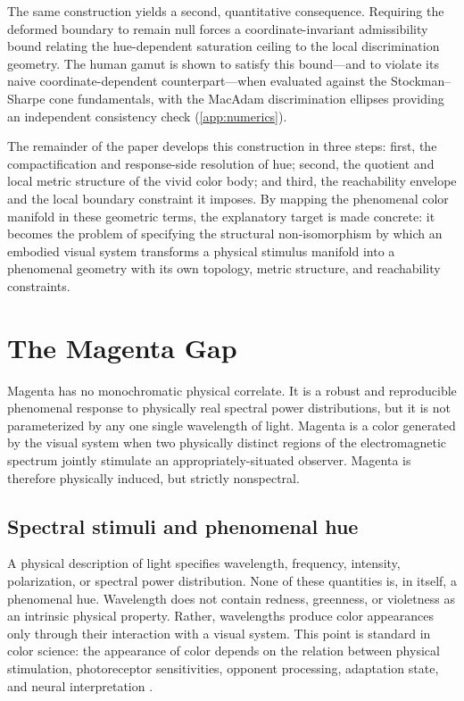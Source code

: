 \documentclass[preprint,12pt,authoryear]{elsarticle}
\theoremstyle{plain}
\theoremstyle{definition}
\theoremstyle{remark}
\begin{document}
The same construction yields a second, quantitative consequence. Requiring the deformed boundary to remain null forces a coordinate-invariant admissibility bound relating the hue-dependent saturation ceiling to the local discrimination geometry. The human gamut is shown to satisfy this bound---and to violate its naive coordinate-dependent counterpart---when evaluated against the Stockman--Sharpe cone fundamentals, with the MacAdam discrimination ellipses providing an independent consistency check (\ref{app:numerics}).

The remainder of the paper develops this construction in three steps: first, the compactification and response-side resolution of hue; second, the quotient and local metric structure of the vivid color body; and third, the reachability envelope and the local boundary constraint it imposes. By mapping the phenomenal color manifold in these geometric terms, the explanatory target is made concrete: it becomes the problem of specifying the structural non-isomorphism by which an embodied visual system transforms a physical stimulus manifold into a phenomenal geometry with its own topology, metric structure, and reachability constraints.


\section{The Magenta Gap}
\label{sec:magenta-gap}

\noindent Magenta has no monochromatic physical correlate. It is a robust and reproducible phenomenal response to physically real spectral power distributions, but it is not parameterized by any one single wavelength of light. Magenta is a color generated by the visual system when two physically distinct regions of the electromagnetic spectrum jointly stimulate an appropriately-situated observer. Magenta is therefore physically induced, but strictly nonspectral.

\subsection{Spectral stimuli and phenomenal hue}
\label{subsec:spectral-stimuli-phenomenal-hue}

\noindent A physical description of light specifies wavelength, frequency, intensity, polarization, or spectral power distribution. None of these quantities is, in itself, a phenomenal hue. Wavelength does not contain redness, greenness, or violetness as an intrinsic physical property. Rather, wavelengths produce color appearances only through their interaction with a visual system. This point is standard in color science: the appearance of color depends on the relation between physical stimulation, photoreceptor sensitivities, opponent processing, adaptation state, and neural interpretation \citep{Shevell2003,Hardin1988,Thompson1995}.
\end{document}

